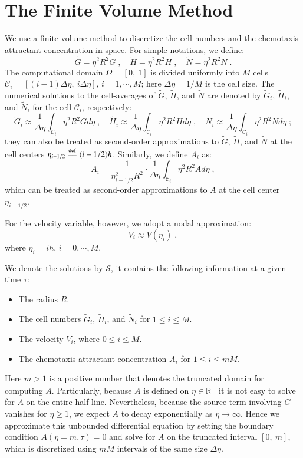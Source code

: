 \documentclass{amsart}
\theoremstyle{definition}
\theoremstyle{remark}
\numberwithin{equation}{section}
\numberwithin{figure}{section}
\newcommand{\eqdef}{\stackrel{\mathrm{def}}{=\joinrel=}}
\begin{document}
\section{The Finite Volume Method}
\label{sec:fvm}
We use a finite volume method to discretize the cell numbers and the chemotaxis attractant concentration in space.
For simple notations, we define:
\begin{equation}
\tilde{G} = \eta^2R^2G\;,\quad
\tilde{H} = \eta^2R^2H\;,\quad
\tilde{N} = \eta^2R^2N\;.
\end{equation}
The computational domain $\Omega=[0,\ 1]$ is divided uniformly into $M$ cells $\mathcal{C}_i=[(i-1)\Delta\eta,\ i\Delta\eta]$, $i=1,\cdots,M$; here $\Delta\eta=1/M$ is the cell size.
The numerical solutions to the cell-averages of $\tilde{G}$, $\tilde{H}$, and $\tilde{N}$ are denoted by $\tilde{G}_i$, $\tilde{H}_i$, and $\tilde{N}_i$ for the cell $\mathcal{C}_i$, respectively:
\begin{displaymath}
\tilde{G}_i \approx \frac{1}{\Delta\eta}\int_{\mathcal{C}_i}\eta^2R^2Gd\eta\;,\quad
\tilde{H}_i \approx \frac{1}{\Delta\eta}\int_{\mathcal{C}_i}\eta^2R^2Hd\eta\;,\quad
\tilde{N}_i \approx \frac{1}{\Delta\eta}\int_{\mathcal{C}_i}\eta^2R^2Nd\eta\;;
\end{displaymath}
they can also be treated as second-order approximations to $\tilde{G}$, $\tilde{H}$, and $\tilde{N}$ at the cell centers $\eta_{i-1/2}\eqdef(i-1/2)h$.
Similarly, we define $A_i$ as:
\begin{displaymath}
  A_i = \frac{1}{\eta_{i-1/2}^2R^2}\cdot\frac{1}{\Delta\eta}\int_{\mathcal{C}_i}\eta^2R^2Ad\eta\;,
\end{displaymath}
which can be treated as second-order approximations to $A$ at the cell center $\eta_{i-1/2}$.

For the velocity variable, however, we adopt a nodal approximation:
\begin{displaymath}
V_i \approx V(\eta_i)\;,
\end{displaymath}
where $\eta_i=ih$, $i=0,\cdots,M$.

We denote the solutions by $\mathcal{S}$, it contains the following information at a given time $\tau$:
\begin{itemize}
\item The radius $R$.
\item The cell numbers $\tilde{G}_i$, $\tilde{H}_i$, and $\tilde{N}_i$ for $1\le i\le M$.
\item The velocity $V_i$, where $0\le i\le M$.
\item The chemotaxis attractant concentration $A_i$ for $1\le i\le mM$.
\end{itemize}
Here $m>1$ is a positive number that denotes the truncated domain for computing $A$.
Particularly, because $A$ is defined on $\eta\in\overline{\mathbb{R}^+}$ it is not easy to solve for $A$ on the entire half line.
Nevertheless, because the source term involving $G$ vanishes for $\eta\ge1$, we expect $A$ to decay exponentially as $\eta\to\infty$.
Hence we approximate this unbounded differential equation by setting the boundary condition $A(\eta=m,\tau)=0$ and solve for $A$ on the truncated interval $[0,\ m]$, which is discretized using $mM$ intervals of the same size $\Delta\eta$.
\end{document}
